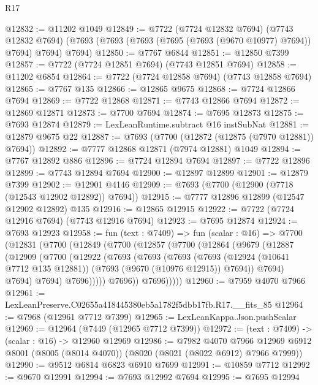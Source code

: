 \begin{lexlean}{R17}
\begin{coremodule}
@12832 := @11202 @1049
@12849 := @7722
    (@7724 @12832 @7694)
    (@7743 @12832 @7694)
    (@7693 (@7693 (@7693 (@7695 (@7693 (@9670 @10977) @7694)) @7694) @7694) @7694)
@12850 := @7767 @6844
@12851 := @12850 @7399
@12857 := @7722 (@7724 @12851 @7694) (@7743 @12851 @7694)
@12858 := @11202 @6854
@12864 := @7722 (@7724 @12858 @7694) (@7743 @12858 @7694)
@12865 := @7767 @135
@12866 := @12865 @9675
@12868 := @7724 @12866 @7694
@12869 := @7722 @12868
@12871 := @7743 @12866 @7694
@12872 := @12869 @12871
@12873 := @7700 @7694
@12874 := @7695 @12873
@12875 := @7693 @12874
@12879 := LexLeanRuntime.subtract @16 instSubNat
@12881 := @12879 @9675 @22
@12887 := @7693 (@7700 (@12872 (@12875 (@7970 @12881)) @7694))
@12892 := @7777 @12868 @12871 (@7974 @12881) @1049
@12894 := @7767 @12892 @886
@12896 := @7724 @12894 @7694
@12897 := @7722 @12896
@12899 := @7743 @12894 @7694
@12900 := @12897 @12899
@12901 := @12879 @7399
@12902 := @12901 @4146
@12909 := @7693 (@7700 (@12900 (@7718 (@12543 @12902 @12892)) @7694))
@12915 := @7777 @12896 @12899 (@12547 @12902 @12892) @135
@12916 := @12865 @12915
@12922 := @7722 (@7724 @12916 @7694) (@7743 @12916 @7694)
@12923 := @7695 @12874
@12924 := @7693 @12923
@12958 := fun (text : @7409) =>
  fun (scalar : @16) =>
  @7700
    (@12831
      (@7700
        (@12849
          (@7700
            (@12857
              (@7700
                (@12864
                  (@9679
                    (@12887
                      (@12909
                        (@7700
                          (@12922
                            (@7693
                              (@7693
                                (@7693
                                  (@7693
                                    (@12924 (@10641 @7712 @135 @12881))
                                    (@7693 (@9670 (@10976 @12915)) @7694))
                                  @7694)
                                @7694)
                              @7694)
                            @7696)))))
                  @7696))
              @7696)))))
@12960 := @7959 @4070 @7966
@12961 := LexLeanPreserve.C02655a418445380eb5a1782f5dbb17fb.R17.__fits_85
@12964 := @7968 (@12961 @7712 @7399)
@12965 := LexLeanKappa.Json.pushScalar
@12969 := @12964 (@7449 (@12965 @7712 @7399))
@12972 := (text : @7409) -> (scalar : @16) -> @12960 @12969
@12986 := @7982
    @4070
    @7966
    @12969
    @6912
    @8001
    (@8005 (@8014 @4070))
    (@8020 (@8021 (@8022 @6912) @7966 @7999))
@12990 := @9512 @6814 @6823 @6910 @7699
@12991 := @10859 @7712
@12992 := @9670 @12991
@12994 := @7693 @12992 @7694
@12995 := @7695 @12994

\end{coremodule}
\end{lexlean}
